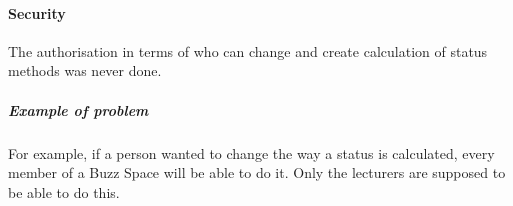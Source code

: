 
\paragraph{Security}
	The authorisation in terms of who can change and create calculation of status methods was never done. 
	\subparagraph{Example of problem}
		For example, if a person wanted to change the way a status is calculated, every member of a Buzz Space will be able to do it. Only the lecturers are supposed to be able to do this. 

